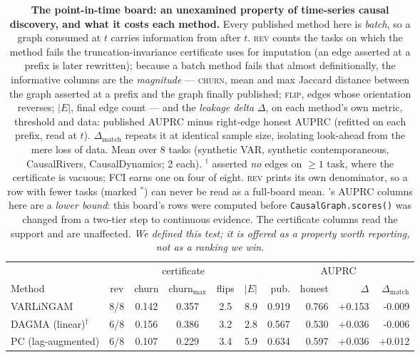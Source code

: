 \begin{table}[t]\centering\small
\setlength{\tabcolsep}{4.5pt}
\caption{\textbf{The point-in-time board: an unexamined property of time-series causal
discovery, and what it costs each method.} Every published method here is \emph{batch},
so a graph consumed at $t$ carries information from after $t$. \textsc{rev} counts the
tasks on which the method fails the truncation-invariance certificate \cafe{} uses for
imputation (an edge asserted at a prefix is later rewritten); because a batch method
fails that almost definitionally, the informative columns are the \emph{magnitude} ---
\textsc{churn}, mean and max Jaccard distance between the graph asserted at a prefix
and the graph finally published; \textsc{flip}, edges whose orientation reverses;
$|E|$, final edge count --- and the \emph{leakage delta} $\Delta$, on each method's own
metric, threshold and data: published AUPRC minus right-edge honest AUPRC (refitted on
each prefix, read at $t$). $\Delta_{\text{match}}$ repeats it at identical sample size,
isolating look-ahead from the mere loss of data. Mean over 8 tasks (synthetic
VAR, synthetic contemporaneous, CausalRivers, CausalDynamics; 2 each).
$^{\dagger}$ asserted \emph{no} edges on $\ge1$ task, where the certificate is vacuous;
FCI earns one on four of eight. \textsc{rev} prints its own denominator, so a row with
fewer tasks (marked $^{\ast}$) can never be read as a full-board mean.
\cd{}'s AUPRC columns here are a \emph{lower bound}: this board's rows were computed
before \texttt{CausalGraph.scores()} was changed from a two-tier step to continuous
evidence. The certificate columns read the support and are unaffected.
\emph{We defined this test; it is offered as a property worth reporting, not as a
ranking we win.}}
\label{tab:pit}
\begin{tabular}{@{}lccccrrrrr@{}}
\toprule
 & \multicolumn{5}{c}{certificate} & \multicolumn{4}{c}{AUPRC} \\
\cmidrule(lr){2-6}\cmidrule(lr){7-10}
Method & rev & churn & churn$_{\max}$ & flips & $|E|$ & pub. & honest & $\Delta$ & $\Delta_{\text{match}}$ \\
\midrule
VARLiNGAM & 8/8 & 0.142 & 0.357 & 2.5 & 8.9 & 0.919 & 0.766 & +0.153 & -0.009 \\
DAGMA (linear)$^{\dagger}$ & 6/8 & 0.156 & 0.386 & 3.2 & 2.8 & 0.567 & 0.530 & +0.036 & -0.006 \\
PC (lag-augmented) & 6/8 & 0.107 & 0.229 & 3.4 & 5.9 & 0.634 & 0.597 & +0.036 & +0.012 \\

\end{tabular}
\end{table}
